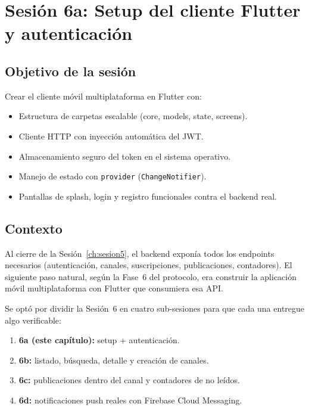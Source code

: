 \chapter{Sesión 6a: Setup del cliente Flutter y autenticación}
\label{ch:sesion6a}

\section{Objetivo de la sesión}

Crear el cliente móvil multiplataforma en Flutter con:

\begin{itemize}[leftmargin=*]
  \item Estructura de carpetas escalable (core, models, state, screens).
  \item Cliente HTTP con inyección automática del JWT.
  \item Almacenamiento seguro del token en el sistema operativo.
  \item Manejo de estado con \texttt{provider} (\texttt{ChangeNotifier}).
  \item Pantallas de splash, login y registro funcionales contra el backend real.
\end{itemize}

\section{Contexto}

Al cierre de la Sesión~\ref{ch:sesion5}, el backend exponía todos los endpoints necesarios (autenticación, canales, suscripciones, publicaciones, contadores). El siguiente paso natural, según la Fase~6 del protocolo, era construir la aplicación móvil multiplataforma con Flutter que consumiera esa API.

Se optó por dividir la Sesión~6 en cuatro sub-sesiones para que cada una entregue algo verificable:

\begin{enumerate}[leftmargin=*]
  \item \textbf{6a (este capítulo):} setup + autenticación.
  \item \textbf{6b:} listado, búsqueda, detalle y creación de canales.
  \item \textbf{6c:} publicaciones dentro del canal y contadores de no leídos.
  \item \textbf{6d:} notificaciones push reales con Firebase Cloud Messaging.
\end{enumerate}


